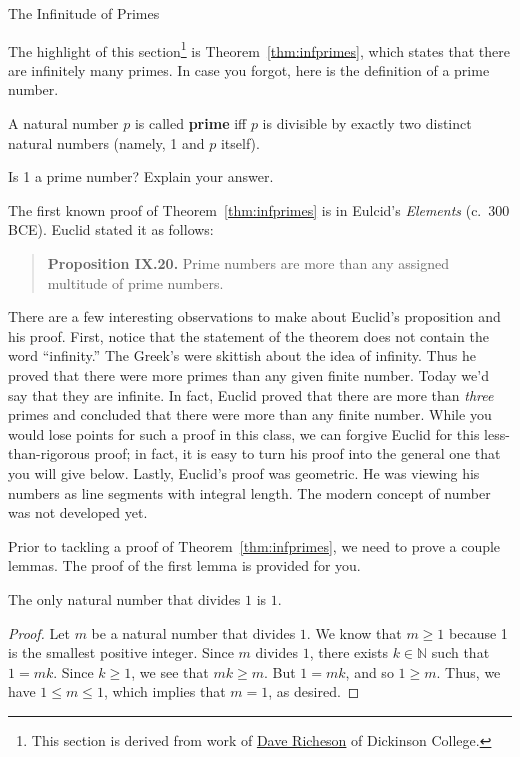 \begin{section}{The Infinitude of Primes}

The highlight of this section\footnote{This section is derived from work of \href{http://users.dickinson.edu/~richesod/}{Dave Richeson} of Dickinson College.} is Theorem~\ref{thm:infprimes}, which states that there are infinitely many primes. In case you forgot, here is the definition of a prime number.

\begin{definition}
A natural number $p$ is called \textbf{prime} iff $p$ is divisible by exactly two distinct natural numbers (namely, 1 and $p$ itself).
\end{definition}

\begin{exercise}
Is 1 a prime number?  Explain your answer.
\end{exercise}

The first known proof of Theorem~\ref{thm:infprimes} is in Eulcid's \emph{Elements} (c.\ 300 BCE). Euclid stated it as follows: 
\begin{quote}
\textbf{Proposition IX.20.} Prime numbers are more than any assigned multitude of prime numbers.
\end{quote}
There are a few interesting observations to make about Euclid's proposition and his proof. First, notice that the statement of the theorem does not contain the word ``infinity.'' The Greek's were skittish about the idea of infinity. Thus he proved that there were more primes than any given finite number. Today we'd say that they are infinite. In fact, Euclid proved that there are more than \emph{three} primes and concluded that there were more than any finite number. While you would lose points for such a proof in this class, we can forgive Euclid for this less-than-rigorous proof;  in fact, it is easy to turn his proof into the general one that you will give below. Lastly, Euclid's proof was geometric. He was viewing his numbers as line segments with integral length. The modern concept of number was not developed yet.

Prior to tackling a proof of Theorem~\ref{thm:infprimes}, we need to prove a couple lemmas.  The proof of the first lemma is provided for you. 

\begin{lemma}\label{lem:divisorsof1}
The only natural number that divides $1$ is $1$.  
\end{lemma}

\begin{proof}
Let $m$ be a natural number that divides $1$. We know that $m\geq 1$ because 1 is the smallest positive integer. Since $m$ divides $1$, there exists $k\in \mathbb{N}$ such that $1=mk$. Since $k\geq 1$, we see that $mk\geq m$.  But $1=mk$, and so $1\geq m$.  Thus, we have $1\leq m \leq 1$, which implies that $m=1$, as desired.
\end{proof}


\end{section}
